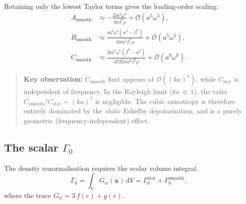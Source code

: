 \documentclass[11pt,a4paper]{article}
\newcommand{\bx}{\mathbf{x}}
\newcommand{\dd}{\mathrm{d}}
\newcommand{\order}[1]{\mathcal{O}\!\left(#1\right)}
\begin{document}
Retaining only the lowest Taylor terms gives the leading-order
scaling:
\begin{align}
  A_\text{smooth} &\approx
    -\frac{2i a^3 \omega^3}{3\pi\beta^5\rho}
  + \order{a^5\omega^5},
  \label{eq:Asmooth} \\[6pt]
  B_\text{smooth} &\approx
    \frac{i a^3 \omega^3(\alpha^5 - \beta^5)}
         {3\pi\alpha^5\beta^5\rho}
  + \order{a^5\omega^5},
  \label{eq:Bsmooth} \\[6pt]
  C_\text{smooth} &\approx
    \frac{2i a^7 \omega^7(\beta^9 - \alpha^9)}
         {4725\pi\alpha^9\beta^9\rho}
  + \order{a^9\omega^9}.
  \label{eq:Csmooth}
\end{align}

\begin{quote}
\textbf{Key observation:} $C_\text{smooth}$ first appears at
$\order{(ka)^7}$, while $C_\text{stat}$ is independent of
frequency. In the Rayleigh limit ($ka \ll 1$), the ratio
$C_\text{smooth}/C_\text{stat} \sim (ka)^7$ is negligible. The
cubic anisotropy is therefore entirely dominated by the
\emph{static} Eshelby depolarization, and is a purely geometric
(frequency-independent) effect.
\end{quote}

\subsection{The scalar \texorpdfstring{$\Gamma_0$}{Gamma\_0}}
\label{sec:gamma0}

The density renormalisation requires the scalar volume integral
\begin{equation}
  \Gamma_0 = \int_V G_{ii}(\bx)\,\dd V
  = \Gamma_0^\text{stat} + \Gamma_0^\text{smooth},
  \label{eq:Gamma0}
\end{equation}
where the trace $G_{ii} = 3\,f(r) + g(r)$.
\end{document}
